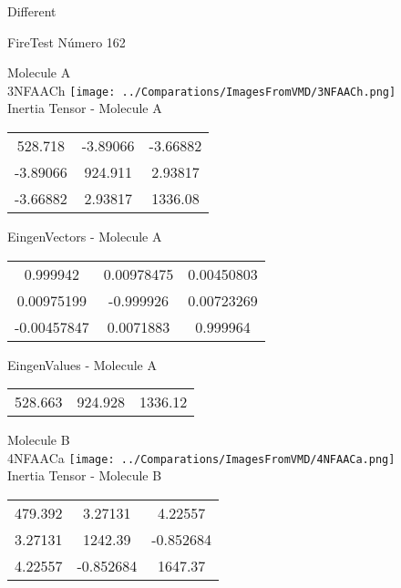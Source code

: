 \begin{center}
\vtab
\vtab
\textcolor{NavyBlue}{\Large Different}
\end{center}

 \newpage

\vtab[-2cm]
\begin{center}
{\large FireTest \tab Número 162}
\end{center}
\begin{multicols}{2}
\begin{center}

Molecule A \\ 
3NFAACh
\texttt{[image: ../Comparations/ImagesFromVMD/3NFAACh.png]}
\\
Inertia Tensor - Molecule A \\
\vtab

\begin{tabular}{|c c c|}
528.718	 & 	-3.89066	 & 	-3.66882	 \\
-3.89066	 & 	924.911	 & 	2.93817	 \\
-3.66882	 & 	2.93817	 & 	1336.08
\end{tabular}

\vtab
 EingenVectors - Molecule A     \\
\vtab
\begin{tabular}{|c c c|}
0.999942	 & 	0.00978475	 & 	0.00450803	 \\
0.00975199	 & 	-0.999926	 & 	0.00723269	 \\
-0.00457847	 & 	0.0071883	 & 	0.999964
\end{tabular}

\vtab
 EingenValues - Molecule A     \\
\vtab
\begin{tabular}{|c c c|}
528.663	 & 	924.928	 & 	1336.12	 \\
\end{tabular}
\columnbreak

Molecule B \\ 
4NFAACa
\texttt{[image: ../Comparations/ImagesFromVMD/4NFAACa.png]}
\\
Inertia Tensor - Molecule B \\
\vtab

\begin{tabular}{|c c c|}
479.392	 & 	3.27131	 & 	4.22557	 \\
3.27131	 & 	1242.39	 & 	-0.852684	 \\
4.22557	 & 	-0.852684	 & 	1647.37
\end{tabular}


\end{center}
\end{multicols}
